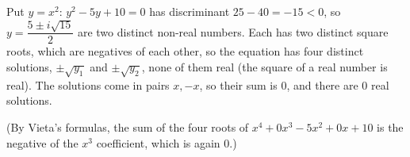 Put $y=x^2$: $y^2-5y+10=0$ has discriminant $25-40=-15<0$, so $y=\dfrac{5\pm i\sqrt{15}}{2}$ are two distinct non-real numbers. Each has two distinct square roots, which are negatives of each other, so the equation has four distinct solutions, $\pm\sqrt{y_1}$ and $\pm\sqrt{y_2}$, none of them real (the square of a real number is real). The solutions come in pairs $x,-x$, so their sum is $\boxed{0}$, and there are $\boxed{0}$ real solutions.

(By Vieta's formulas, the sum of the four roots of $x^4+0x^3-5x^2+0x+10$ is the negative of the $x^3$ coefficient, which is again $0$.)
